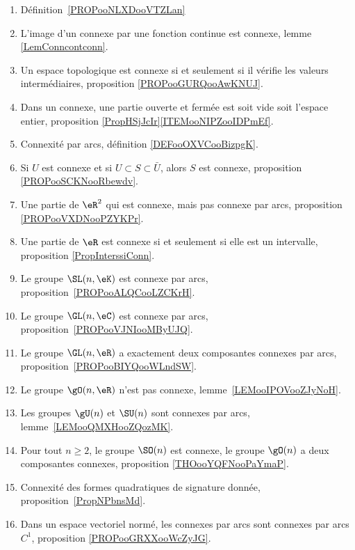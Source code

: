 	\label{THEMEooConnexite}
\begin{enumerate}
	\item
	      Définition~\ref{PROPooNLXDooVTZLan}
	\item
	      L'image d'un connexe par une fonction continue est connexe, lemme \ref{LemConncontconn}.
	\item
	      Un espace topologique est connexe si et seulement si il vérifie les valeurs intermédiaires, proposition \ref{PROPooGURQooAwKNUJ}.
	\item
	      Dans un connexe, une partie ouverte et fermée est soit vide soit l'espace entier, proposition \ref{PropHSjJcIr}\ref{ITEMooNIPZooIDPmEf}.
	\item
	      Connexité par arcs, définition \ref{DEFooOXVCooBizpgK}.
	\item
	      Si \( U\) est connexe et si \( U\subset S\subset \bar U\), alors \( S\) est connexe, proposition \ref{PROPooSCKNooRbewdv}.
	\item
	      Une partie de \( \eR^2\) qui est connexe, mais pas connexe par arcs, proposition \ref{PROPooVXDNooPZYKPr}.
	\item
	      Une partie de \( \eR\) est connexe si et seulement si elle est un intervalle, proposition \ref{PropInterssiConn}.
	\item
	      Le groupe \( \SL(n,\eK)\) est connexe par arcs, proposition~\ref{PROPooALQCooLZCKrH}.
	\item
	      Le groupe \( \GL(n,\eC)\) est connexe par arcs, proposition~\ref{PROPooVJNIooMByUJQ}.
	\item
	      Le groupe \( \GL(n,\eR)\) a exactement deux composantes connexes par arcs, proposition~\ref{PROPooBIYQooWLndSW}.
	\item
	      Le groupe \( \gO(n,\eR)\) n'est pas connexe, lemme~\ref{LEMooIPOVooZJyNoH}.
	\item
	      Les groupes \( \gU(n)\) et \( \SU(n)\) sont connexes par arcs, lemme~\ref{LEMooQMXHooZQozMK}.
	\item
	      Pour tout \( n\geq 2\), le groupe \( \SO(n)\) est connexe, le groupe \( \gO(n)\) a deux composantes connexes, proposition \ref{THOooYQFNooPaYmaP}.
	\item
	      Connexité des formes quadratiques de signature donnée, proposition~\ref{PropNPbnsMd}.
	\item
	      Dans un espace vectoriel normé, les connexes par arcs sont connexes par arcs \( C^1\), proposition \ref{PROPooGRXXooWcZyJG}.
\end{enumerate}
